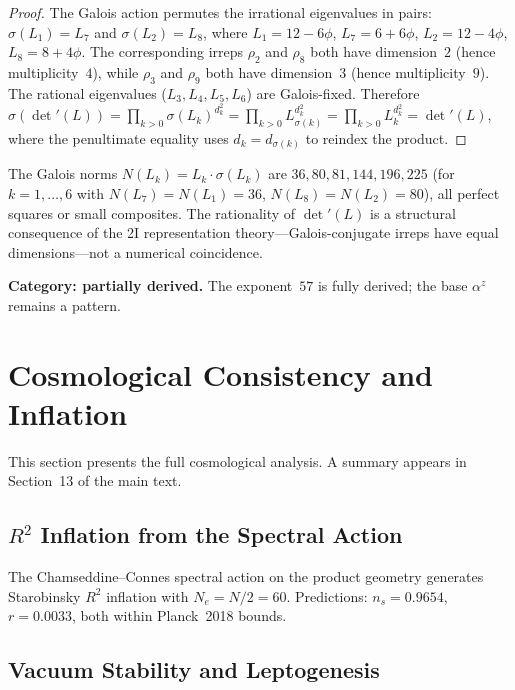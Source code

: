 \documentclass[12pt,a4paper]{article}
\theoremstyle{definition}
\begin{document}
\begin{proof}
The Galois action permutes the irrational eigenvalues in pairs:
$\sigma(L_1) = L_7$ and $\sigma(L_2) = L_8$, where $L_1 = 12 - 6\phi$, $L_7 = 6 + 6\phi$, $L_2 = 12 - 4\phi$, $L_8 = 8 + 4\phi$.
The corresponding irreps $\rho_2$ and $\rho_8$ both have dimension~$2$ (hence multiplicity~$4$), while $\rho_3$ and $\rho_9$ both have dimension~$3$ (hence multiplicity~$9$).  The rational eigenvalues ($L_3, L_4, L_5, L_6$) are Galois-fixed.  Therefore
$\sigma(\det'(L)) = \prod_{k>0} \sigma(L_k)^{d_k^2} = \prod_{k>0} L_{\sigma(k)}^{d_k^2} = \prod_{k>0} L_k^{d_k^2} = \det'(L)$,
where the penultimate equality uses $d_k = d_{\sigma(k)}$ to reindex the product.
\end{proof}

The Galois norms $N(L_k) = L_k \cdot \sigma(L_k)$ are $36, 80, 81, 144, 196, 225$ (for $k = 1,\ldots,6$ with $N(L_7) = N(L_1) = 36$, $N(L_8) = N(L_2) = 80$), all perfect squares or small composites.  The rationality of $\det'(L)$ is a structural consequence of the 2I representation theory---Galois-conjugate irreps have equal dimensions---not a numerical coincidence.

\textbf{Category: partially derived.}  The exponent~$57$ is fully derived; the base $\alpha^z$ remains a pattern.


\section{Cosmological Consistency and Inflation}
\label{sec:S-cosmo}

This section presents the full cosmological analysis.  A summary appears in Section~13 of the main text.

\subsection{\texorpdfstring{$R^2$}{R2} Inflation from the Spectral Action}

The Chamseddine--Connes spectral action on the product geometry generates Starobinsky $R^2$ inflation with $N_e = N/2 = 60$.  Predictions: $n_s = 0.9654$, $r = 0.0033$, both within Planck~2018 bounds.

\subsection{Vacuum Stability and Leptogenesis}
\end{document}

